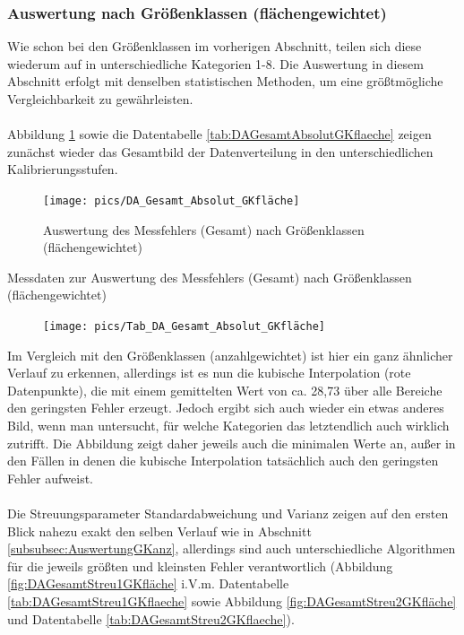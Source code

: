 \documentclass[
fontsize=10pt, 
listof = totoc,
parskip = half	
]{report}
\begin{document}
\subsubsection{Auswertung nach Größenklassen (flächengewichtet)}
\label{subsubsec:AuswertungGKflaeche}
Wie schon bei den Größenklassen im vorherigen Abschnitt, teilen sich diese wiederum auf in unterschiedliche Kategorien 1-8. Die Auswertung in diesem Abschnitt erfolgt mit denselben statistischen Methoden, um eine größtmögliche Vergleichbarkeit zu gewährleisten.
\\\\
\noindent Abbildung \ref{fig:DAGesamtAbsolutGKflaeche} sowie die Datentabelle \ref{tab:DAGesamtAbsolutGKflaeche} zeigen zunächst wieder das Gesamtbild der Datenverteilung in den unterschiedlichen Kalibrierungsstufen.

\begin{figure}[H]
	\centering
	\texttt{[image: pics/DA\_Gesamt\_Absolut\_GKfläche]}
	\caption{Auswertung des Messfehlers (Gesamt) nach Größenklassen (flächengewichtet)}
	\label{fig:DAGesamtAbsolutGKflaeche}
\end{figure}

\begin{table}[H]
	\caption{Messdaten zur Auswertung des Messfehlers (Gesamt) nach Größenklassen (flächengewichtet)}
	\label{tab:DAGesamtAbsolutGKflaeche}
	\begin{figure}[H]
		\centering
		\texttt{[image: pics/Tab\_DA\_Gesamt\_Absolut\_GKfläche]}
	\end{figure}
\end{table}

\noindent Im Vergleich mit den Größenklassen (anzahlgewichtet) ist hier ein ganz ähnlicher Verlauf zu erkennen, allerdings ist es nun die kubische Interpolation (rote Datenpunkte), die mit einem gemittelten Wert von ca. 28,73 über alle Bereiche den geringsten Fehler erzeugt. Jedoch ergibt sich auch wieder ein etwas anderes Bild, wenn man untersucht, für welche Kategorien das letztendlich auch wirklich zutrifft. Die Abbildung zeigt daher jeweils auch die minimalen Werte an, außer in den Fällen in denen die kubische Interpolation tatsächlich auch den geringsten Fehler aufweist. 
\\\\
\noindent Die Streuungsparameter Standardabweichung und Varianz zeigen auf den ersten Blick nahezu exakt den selben Verlauf wie in Abschnitt \ref{subsubsec:AuswertungGKanz}, allerdings sind auch unterschiedliche Algorithmen für die jeweils größten und kleinsten Fehler verantwortlich (Abbildung \ref{fig:DAGesamtStreu1GKfläche} i.V.m. Datentabelle \ref{tab:DAGesamtStreu1GKflaeche} sowie Abbildung \ref{fig:DAGesamtStreu2GKfläche} und Datentabelle \ref{tab:DAGesamtStreu2GKflaeche}).
\end{document}
